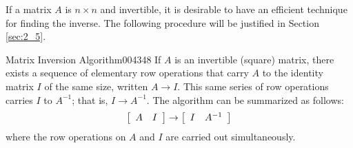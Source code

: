 If a matrix $A$ is $n \times n$ and invertible, it is desirable to have an efficient technique for finding the inverse. The following procedure will be justified in Section \ref{sec:2_5}.

\begin{theorem*}{Matrix Inversion Algorithm}{004348}
If $A$ is an invertible (square) matrix, there exists a sequence of elementary row operations that carry $A$ to the identity matrix $I$ of the same size, written $A \to I$. This same series of row operations carries $I$ to $A^{-1}$; that is, $I \to A^{-1}$. The algorithm can be summarized as follows:
\begin{equation*}
\left[ \begin{array}{cc}
A & I
\end{array} \right] \rightarrow 
\left[ \begin{array}{cc}
I & A^{-1}
\end{array} \right]
\end{equation*}
where the row operations on $A$ and $I$ are carried out simultaneously.
\end{theorem*}

